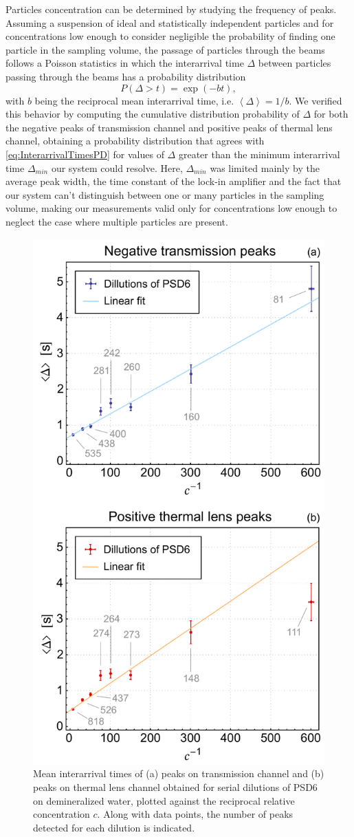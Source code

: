 \documentclass[9pt,twocolumn,twoside]{osajnl}
\begin{document}
Particles concentration can be determined by studying the frequency of peaks. Assuming a suspension of ideal and statistically independent particles and for concentrations low enough to consider negligible the probability of finding one particle in the sampling volume, the passage of particles through the beams follows a Poisson statistics in which the interarrival time $\Delta$ between particles passing through the beams has a probability distribution
\begin{equation}
	P\left(\Delta > t\right) = \exp\left( -b t \right),
\label{eq:InterarrivalTimesPD}
\end{equation}
with $b$ being the reciprocal mean interarrival time, i.e. $\left\langle \Delta \right\rangle = 1/b$. We verified this behavior by computing the cumulative distribution probability of $\Delta$ for both the negative peaks of transmission channel and positive peaks of thermal lens channel, obtaining a probability distribution that agrees with \ref{eq:InterarrivalTimesPD} for values of $\Delta$ greater than the minimum interarrival time $\Delta_{min}$ our system could resolve. Here, $\Delta_{min}$ was limited mainly by the average peak width, the time constant of the lock-in amplifier and the fact that our system can't distinguish between one or many particles in the sampling volume, making our measurements valid only for concentrations low enough to neglect the case where multiple particles are present.

\begin{figure}[t!]
	\centering \includegraphics[width=.46\textwidth]{figures/InterarrivalTimes.pdf}
	\caption{Mean interarrival times of (a) peaks on transmission channel and (b) peaks on thermal lens channel obtained for serial dilutions of PSD6 on demineralized water, plotted against the reciprocal relative concentration $c$. Along with data points, the number of peaks detected for each dilution is indicated.}
	\label{fig:InterarrivalTimes}
\end{figure}
\end{document}
